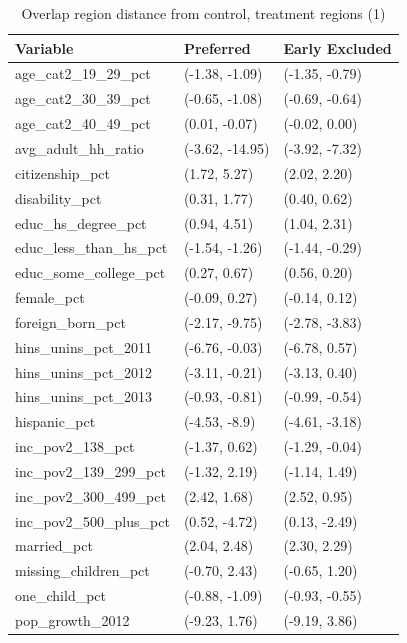 \documentclass[aoas]{imsart}
\theoremstyle{plain}
\theoremstyle{remark}
\begin{document}
\begin{appendix}
\begin{table}[ht]
\centering
    \caption{Overlap region distance from control, treatment regions (1)}
    \label{tab:oatedist1}
\begin{tabular}{lll}
  \hline
Variable & Preferred & Early Excluded \\ 
  \hline
age\_cat2\_19\_29\_pct & (-1.38, -1.09) & (-1.35, -0.79) \\ 
  age\_cat2\_30\_39\_pct & (-0.65, -1.08) & (-0.69, -0.64) \\ 
  age\_cat2\_40\_49\_pct & (0.01, -0.07) & (-0.02, 0.00) \\ 
  avg\_adult\_hh\_ratio & (-3.62, -14.95) & (-3.92, -7.32) \\ 
  citizenship\_pct & (1.72, 5.27) & (2.02, 2.20) \\ 
  disability\_pct & (0.31, 1.77) & (0.40, 0.62) \\ 
  educ\_hs\_degree\_pct & (0.94, 4.51) & (1.04, 2.31) \\ 
  educ\_less\_than\_hs\_pct & (-1.54, -1.26) & (-1.44, -0.29) \\ 
  educ\_some\_college\_pct & (0.27, 0.67) & (0.56, 0.20) \\ 
  female\_pct & (-0.09, 0.27) & (-0.14, 0.12) \\ 
  foreign\_born\_pct & (-2.17, -9.75) & (-2.78, -3.83) \\ 
  hins\_unins\_pct\_2011 & (-6.76, -0.03) & (-6.78, 0.57) \\ 
  hins\_unins\_pct\_2012 & (-3.11, -0.21) & (-3.13, 0.40) \\ 
  hins\_unins\_pct\_2013 & (-0.93, -0.81) & (-0.99, -0.54) \\ 
  hispanic\_pct & (-4.53, -8.9) & (-4.61, -3.18) \\ 
  inc\_pov2\_138\_pct & (-1.37, 0.62) & (-1.29, -0.04) \\ 
  inc\_pov2\_139\_299\_pct & (-1.32, 2.19) & (-1.14, 1.49) \\ 
  inc\_pov2\_300\_499\_pct & (2.42, 1.68) & (2.52, 0.95) \\ 
  inc\_pov2\_500\_plus\_pct & (0.52, -4.72) & (0.13, -2.49) \\ 
  married\_pct & (2.04, 2.48) & (2.30, 2.29) \\ 
  missing\_children\_pct & (-0.70, 2.43) & (-0.65, 1.20) \\ 
  one\_child\_pct & (-0.88, -1.09) & (-0.93, -0.55) \\ 
  pop\_growth\_2012 & (-9.23, 1.76) & (-9.19, 3.86) \\ 

\end{tabular}
\end{table}
\end{appendix}
\end{document}

